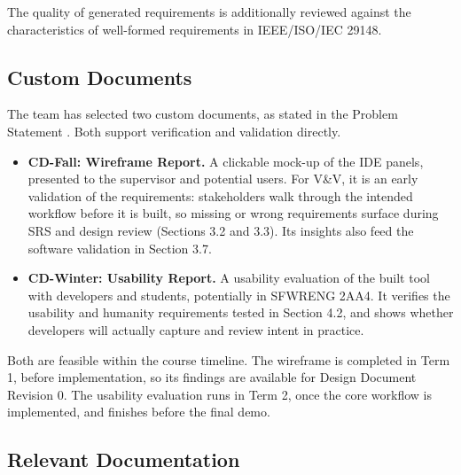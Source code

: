 \documentclass[12pt, titlepage]{article}
\begin{document}
The quality of generated requirements is additionally reviewed against the
characteristics of well-formed requirements in IEEE/ISO/IEC 29148.


\subsection{Custom Documents}


The team has selected two custom documents, as stated in the Problem
Statement \citep{ProblemStatement}. Both support verification and validation
directly.

\begin{itemize}
  \item \textbf{CD-Fall: Wireframe Report.} A clickable mock-up of the
  \progname{} IDE panels, presented to the supervisor and potential users. For
  V\&V, it is an early validation of the requirements: stakeholders walk
  through the intended workflow before it is built, so missing or wrong
  requirements surface during SRS and design review (Sections 3.2 and 3.3).
  Its insights also feed the software validation in Section 3.7.
  \item \textbf{CD-Winter: Usability Report.} A usability evaluation of the
  built tool with developers and students, potentially in SFWRENG 2AA4. It
  verifies the usability and humanity requirements tested in Section 4.2, and
  shows whether developers will actually capture and review intent in
  practice.
\end{itemize}

Both are feasible within the course timeline. The wireframe is completed in
Term 1, before implementation, so its findings are available for Design
Document Revision 0. The usability evaluation runs in Term 2, once the core
workflow is implemented, and finishes before the final demo.

\subsection{Relevant Documentation}
\end{document}
